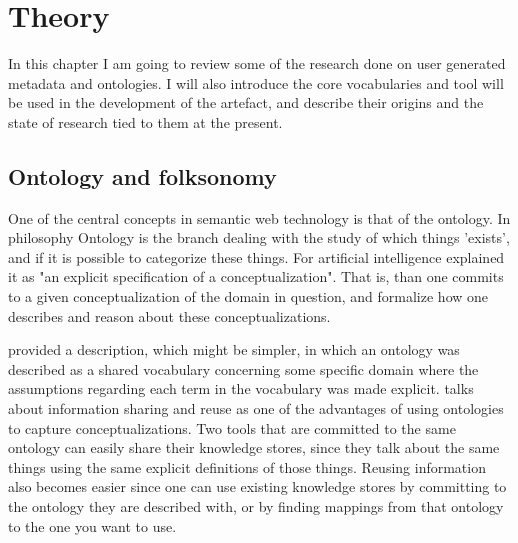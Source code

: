 
\chapter{Theory} %
\label{Theory} %

In this chapter I am going to review some of the research done on user generated metadata and ontologies.
I will also introduce the core vocabularies and tool will be used in the development of the artefact,
and describe their origins and the state of research tied to them at the present.

\section{Ontology and folksonomy}
One of the central concepts in semantic web technology is that of the ontology.
In philosophy Ontology is the branch dealing with the study of which things 'exists', and if it is possible to categorize these things.
For artificial intelligence \citet{Gruber1993} explained it as "an explicit specification of a conceptualization".
That is, than one commits to a given conceptualization of the domain in question,
and formalize how one describes and reason about these conceptualizations.

\citet{Guarino1998} provided a description, which might be simpler, in which an ontology was described as a shared vocabulary
concerning some specific domain where the assumptions regarding each term in the vocabulary was made explicit.
\citet{Pretorius2004} talks about information sharing and reuse as one of the advantages of using ontologies to
capture conceptualizations.
Two tools that are committed to the same ontology can easily share their knowledge stores,
since they talk about the same things using the same explicit definitions of those things.
Reusing information also becomes easier since one can use existing knowledge stores by committing to the ontology they are
described with, or by finding mappings from that ontology to the one you want to use.


